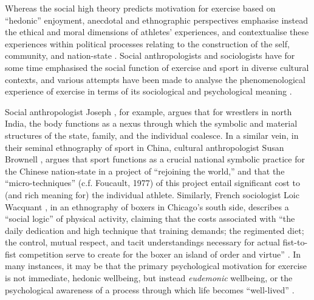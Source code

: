 \begin{CJK}{UTF8}{gbsn}
Whereas the social high theory predicts motivation for exercise based on ``hedonic'' enjoyment, anecdotal and ethnographic perspectives emphasise instead the ethical and moral dimensions of athletes' experiences, and contextualise these experiences within political processes relating to the construction of the self, community, and nation-state \citep{Alter1993,Brownell1995,Downey2005,Wacquant2004}.
Social anthropologists and sociologists have for some time emphasised the social function of exercise and sport in diverse cultural contexts, and various attempts have been made to analyse the phenomenological experience of exercise in terms of its sociological and psychological meaning \citep{Bourdieu1978}.

Social anthropologist Joseph \textcite{Alter1993}, for example, argues that for wrestlers in north India, the body functions as a nexus through which the symbolic and material structures of the state, family, and the individual coalesce.  In a similar vein, in their seminal ethnography of sport in China, cultural anthropologist Susan Brownell \textcite{Brownell1995}, argues that sport functions as a crucial national symbolic practice for the Chinese nation-state in a project of ``rejoining the world,'' and that the ``micro-techniques'' (c.f. Foucault, 1977) of this project entail significant cost to (and rich meaning for) the individual athlete.   Similarly, French sociologist Loic Wacquant \textcite{Wacquant2004}, in an ethnography of boxers in Chicago's south side, describes a ``social logic'' of physical activity, claiming that the costs associated with ``the daily dedication and high technique that training demands; the regimented diet; the control, mutual respect, and tacit understandings necessary for actual fist-to-fist competition serve to create for the boxer an island of order and virtue'' \textcite[17]{Wacquant2004}. In many instances, it may be that the primary psychological motivation for exercise is not immediate, hedonic wellbeing, but instead \textit{eudemonic} wellbeing, or the psychological awareness of a process through which life becomes ``well-lived'' \citep{Fave2009,Huta2013}.


\end{CJK}

